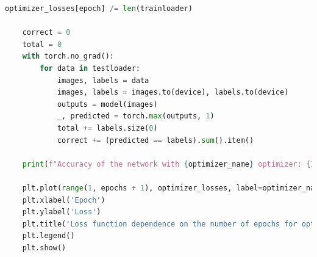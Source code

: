 \documentclass[a4paper, 14pt]{extarticle}
\begin{document}
\begin{lstlisting}[language={python},caption={VGG16},label={lst:code2}]
        optimizer_losses[epoch] /= len(trainloader)

    correct = 0
    total = 0
    with torch.no_grad():
        for data in testloader:
            images, labels = data
            images, labels = images.to(device), labels.to(device)
            outputs = model(images)
            _, predicted = torch.max(outputs, 1)
            total += labels.size(0)
            correct += (predicted == labels).sum().item()

    print(f"Accuracy of the network with {optimizer_name} optimizer: {100 * correct / total}%")

    plt.plot(range(1, epochs + 1), optimizer_losses, label=optimizer_name)
    plt.xlabel('Epoch')
    plt.ylabel('Loss')
    plt.title('Loss function dependence on the number of epochs for optimizer ' + optimizer_name)
    plt.legend()
    plt.show()


\end{lstlisting}
\end{document}
